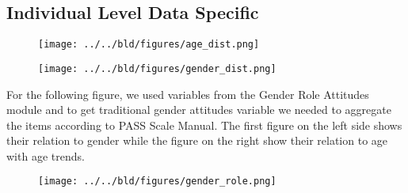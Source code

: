 \documentclass[11pt, a4paper, leqno]{article}
\begin{document}
\subsection{Individual Level Data Specific}
\begin{footnotesize}
\begin{center}

\end{center}
\end{footnotesize}

\begin{figure}[!htb]
    \centerline{\texttt{[image: ../../bld/figures/age\_dist.png]}}
    \caption{\label{fig:1}}
    \end{figure}

\begin{figure}[!htb]
    \centerline{\texttt{[image: ../../bld/figures/gender\_dist.png]}}
    \caption{\label{fig:2}}
    \end{figure}
\clearpage
For the following figure, we used variables from the Gender Role Attitudes module and to get traditional gender attitudes variable we needed to aggregate the items according to PASS Scale Manual. The first figure on the left side shows their relation to gender while the figure on the right show their relation to age with age trends.
\begin{figure}[!htb]
    \centerline{\texttt{[image: ../../bld/figures/gender\_role.png]}}
    \caption{\label{fig:3}}
    \end{figure}


\clearpage
\begin{thebibliography}{1}
\end{thebibliography}


\end{document}
